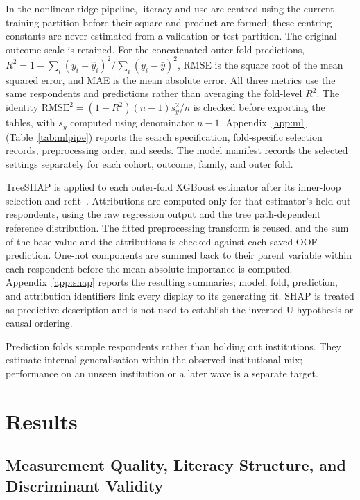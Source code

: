 \documentclass[sustainability,article,accept,moreauthors]{Definitions/mdpi}
\begin{document}
In the nonlinear ridge pipeline, literacy and use are centred using the current training partition before their square and product are formed; these centring constants are never estimated from a validation or test partition. The original outcome scale is retained. For the concatenated outer-fold predictions, $R^2=1-\sum_i(y_i-\hat y_i)^2/\sum_i(y_i-\bar y)^2$, RMSE is the square root of the mean squared error, and MAE is the mean absolute error. All three metrics use the same respondents and predictions rather than averaging the fold-level $R^2$. The identity $\mathrm{RMSE}^2=(1-R^2)(n-1)s_y^2/n$ is checked before exporting the tables, with $s_y$ computed using denominator $n-1$. Appendix~\ref{app:ml} (Table~\ref{tab:mlpipe}) reports the search specification, fold-specific selection records, preprocessing order, and seeds. The model manifest records the selected settings separately for each cohort, outcome, family, and outer fold.

TreeSHAP is applied to each outer-fold XGBoost estimator after its inner-loop selection and refit~\cite{lundberg2017,lundberg2020}. Attributions are computed only for that estimator's held-out respondents, using the raw regression output and the tree path-dependent reference distribution. The fitted preprocessing transform is reused, and the sum of the base value and the attributions is checked against each saved OOF prediction. One-hot components are summed back to their parent variable within each respondent before the mean absolute importance is computed. Appendix~\ref{app:shap} reports the resulting summaries; model, fold, prediction, and attribution identifiers link every display to its generating fit. SHAP is treated as predictive description and is not used to establish the inverted U hypothesis or causal ordering.

Prediction folds sample respondents rather than holding out institutions. They estimate internal generalisation within the observed institutional mix; performance on an unseen institution or a later wave is a separate target.

\section{Results}

\subsection{Measurement Quality, Literacy Structure, and Discriminant Validity}\label{sec:measurementresults}
\end{document}

